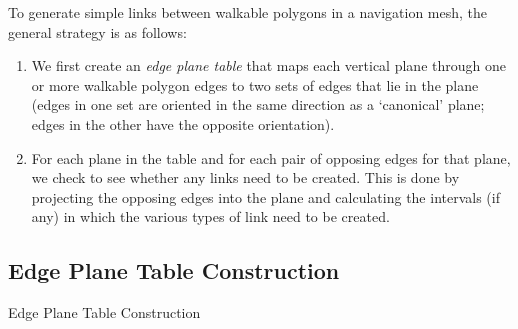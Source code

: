 \documentclass[10pt,twocolumn]{article}
\begin{document}
To generate simple links between walkable polygons in a navigation mesh, the general strategy is as follows:
%
\begin{enumerate}
\item We first create an \emph{edge plane table} that maps each vertical plane through one or more walkable polygon edges to two sets of edges that lie in the plane (edges in one set are oriented in the same direction as a `canonical' plane; edges in the other have the opposite orientation).
\item For each plane in the table and for each pair of opposing edges for that plane, we check to see whether any links need to be created. This is done by projecting the opposing edges into the plane and calculating the intervals (if any) in which the various types of link need to be created.
\end{enumerate}

\subsection{Edge Plane Table Construction}

\begin{stulisting}[t]
\caption{Edge Plane Table Construction}
\label{code:ept-construction}

\end{stulisting}
\end{document}
